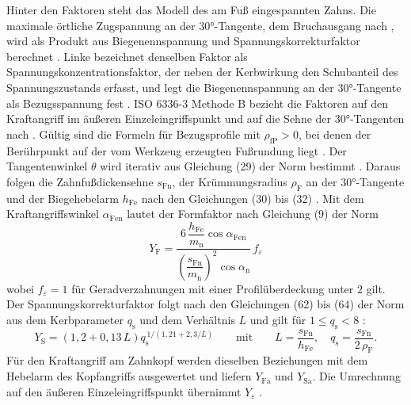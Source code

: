 Hinter den Faktoren steht das Modell des am Fuß eingespannten Zahns. Die maximale örtliche Zugspannung an der $30$°-Tangente, dem Bruchausgang nach , wird als Produkt aus Biegenennspannung und Spannungskorrekturfaktor berechnet \cite[S.~147]{NieWin03}. Linke bezeichnet denselben Faktor als Spannungskonzentrationsfaktor, der neben der Kerbwirkung den Schubanteil des Spannungszustands erfasst, und legt die Biegenennspannung an der $30$°-Tangente als Bezugsspannung fest \cite[S.~298 und 312]{Lin10}. ISO 6336-3 Methode B bezieht die Faktoren auf den Kraftangriff im äußeren Einzeleingriffspunkt und auf die Sehne der $30$°-Tangenten nach  \cite[S.~14]{ISO6336-3}. Gültig sind die Formeln für Bezugsprofile mit $\rho_{\mathrm{fP}} > 0$, bei denen der Berührpunkt auf der vom Werkzeug erzeugten Fußrundung liegt \cite[S.~14]{ISO6336-3}. Der Tangentenwinkel $\theta$ wird iterativ aus Gleichung (29) der Norm bestimmt \cite[S.~19]{ISO6336-3}. Daraus folgen die Zahnfußdickensehne $s_{\mathrm{Fn}}$, der Krümmungsradius $\rho_{\mathrm{F}}$ an der $30$°-Tangente und der Biegehebelarm $h_{\mathrm{Fe}}$ nach den Gleichungen (30) bis (32) \cite[S.~19]{ISO6336-3}. Mit dem Kraftangriffswinkel $\alpha_{\mathrm{Fen}}$ lautet der Formfaktor nach Gleichung (9) der Norm \cite[S.~17]{ISO6336-3}
\begin{equation}
    Y_{\mathrm{F}} = \frac{6\,\dfrac{h_{\mathrm{Fe}}}{m_{\mathrm{n}}}\cos\alpha_{\mathrm{Fen}}}{\left(\dfrac{s_{\mathrm{Fn}}}{m_{\mathrm{n}}}\right)^{2}\cos\alpha_{\mathrm{n}}}\,f_{\varepsilon}
    \label{eq:y_f_iso}
\end{equation}
wobei $f_{\varepsilon} = 1$ für Geradverzahnungen mit einer Profilüberdeckung unter $2$ gilt. Der Spannungskorrekturfaktor folgt nach den Gleichungen (62) bis (64) der Norm aus dem Kerbparameter $q_{\mathrm{s}}$ und dem Verhältnis $L$ und gilt für $1 \leq q_{\mathrm{s}} < 8$ \cite[S.~24 bis 25]{ISO6336-3}:
\begin{equation}
    Y_{\mathrm{S}} = \left(1{,}2 + 0{,}13\,L\right) q_{\mathrm{s}}^{\,1/(1{,}21 + 2{,}3/L)} \qquad \text{mit} \qquad L = \frac{s_{\mathrm{Fn}}}{h_{\mathrm{Fe}}} , \quad q_{\mathrm{s}} = \frac{s_{\mathrm{Fn}}}{2\,\rho_{\mathrm{F}}} .
    \label{eq:y_s_iso}
\end{equation}
Für den Kraftangriff am Zahnkopf werden dieselben Beziehungen mit dem Hebelarm des Kopfangriffs ausgewertet und liefern $Y_{\mathrm{Fa}}$ und $Y_{\mathrm{Sa}}$. Die Umrechnung auf den äußeren Einzeleingriffspunkt übernimmt $Y_{\varepsilon}$ \cite[S.~148 bis 149]{NieWin03}.

